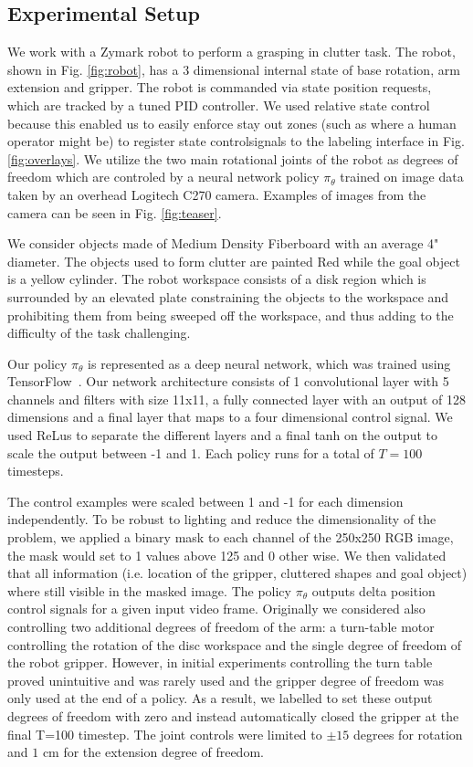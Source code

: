 \documentclass[10pt, conference]{ieeeconf}      %
\begin{document}
\subsection{Experimental Setup}
We work with a Zymark robot to perform a grasping in clutter task. The robot, shown in Fig. \ref{fig:robot}, has a 3 dimensional internal state of base rotation, arm extension and gripper. The robot is commanded via state position requests, which are tracked by a tuned PID controller. We used
relative state control because this enabled us to easily enforce stay out zones (such as where a human operator might
be) to register state controlsignals to the labeling interface in Fig. \ref{fig:overlays}. We utilize the two main rotational joints of the
robot as degrees of freedom which are controled by a neural network policy $\pi_{\theta}$ trained on image data taken by
an overhead Logitech C270 camera. Examples of images from the camera can be seen in Fig. \ref{fig:teaser}.

We consider objects made of Medium Density Fiberboard with an average 4" diameter. The objects used to form clutter are
painted Red while the goal object is a yellow cylinder. The robot workspace consists of a disk region which is
surrounded by an elevated plate constraining the objects to the workspace and prohibiting them from being sweeped off
the workspace, and thus adding to the difficulty of the task challenging.

Our policy $\pi_{\theta}$ is represented as a deep neural network, which was trained using
TensorFlow~\cite{tensorflow2015-whitepaper}. Our network architecture consists of 1 convolutional layer with 5 channels
and filters with size 11x11, a fully connected layer with an output of 128 dimensions and a final layer that maps to a
four dimensional control signal. We used ReLus to separate the different layers and a final tanh on the output to scale
the output between -1 and 1. Each policy runs for a total of $T=100$ timesteps.

The control examples were scaled between 1 and -1 for each dimension independently. To be robust to lighting and reduce the dimensionality of the problem, we applied a binary mask to each channel of the 250x250 RGB image, the mask would set to 1 values above 125 and 0 other wise.  We then validated that all information (i.e. location of the gripper, cluttered shapes and goal object) where still visible in the masked image.
The policy $\pi_\theta$ outputs delta position control signals for a given input video frame.
Originally we considered also controlling two additional degrees of freedom of the arm: a turn-table motor controlling
the rotation of the disc workspace and the single degree of freedom of the robot gripper. However, in initial
experiments controlling the turn table proved unintuitive and was rarely used and the gripper degree of freedom was only used at the end of a policy.
As a result, we labelled to set these output degrees of freedom with zero and instead automatically closed the gripper
at the final T=100 timestep. The joint controls were limited to $\pm 15$ degrees for rotation and $1$ cm for the
extension degree of freedom.
\end{document}
